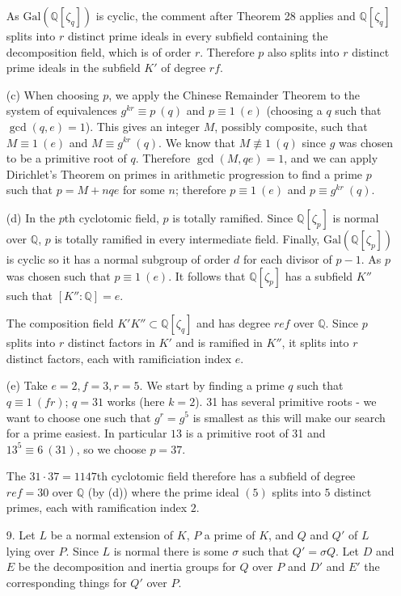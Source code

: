 \documentclass{article}
\newcommand{\Q}[0]{\mathbb{Q}}
\newcommand{\modequiv}[3]{#1 \equiv #2\ (#3)}
\newcommand{\modnotequiv}[3]{#1 \not\equiv #2\ (#3)}
\begin{document}
\begin{enumerate}
    As $\text{Gal}(\Q[\zeta_{q}])$ is cyclic, the comment after Theorem 28 applies and $\Q[\zeta_{q}]$ splits into $r$ distinct prime ideals in every subfield containing the decomposition field, which is of order $r$.  Therefore $p$ also splits into $r$ distinct prime ideals in the subfield $K'$ of degree $rf$.

    \item[(c)] When choosing $p$, we apply the Chinese Remainder Theorem to the system of equivalences $\modequiv{g^{kr}}{p}{q}$ and $\modequiv{p}{1}{e}$ (choosing a $q$ such that $\gcd(q, e) = 1$).  This gives an integer $M$, possibly composite, such that $\modequiv{M}{1}{e}$ and $\modequiv{M}{g^{kr}}{q}$.  We know that $\modnotequiv{M}{1}{q}$ since $g$ was chosen to be a primitive root of $q$.  Therefore $\gcd(M, qe) = 1$, and we can apply Dirichlet's Theorem on primes in arithmetic progression to find a prime $p$ such that $p = M + nqe$ for some $n$; therefore $\modequiv{p}{1}{e}$ and $\modequiv{p}{g^{kr}}{q}$.

    \item[(d)] In the $p$th cyclotomic field, $p$ is totally ramified.  Since $\Q[\zeta_p]$ is normal over $\Q$, $p$ is totally ramified in every intermediate field.  Finally, $\text{Gal}(\Q[\zeta_p])$ is cyclic so it has a normal subgroup of order $d$ for each divisor of $p - 1$.  As $p$ was chosen such that $\modequiv{p}{1}{e}$.  It follows that $\Q[\zeta_p]$ has a subfield $K''$ such that $[K'' : \Q] = e$.

    The composition field $K' K'' \subset \Q[\zeta_{q}]$ and has degree $ref$ over $\Q$.  Since $p$ splits into $r$ distinct factors in $K'$ and is ramified in $K''$, it splits into $r$ distinct factors, each with ramificiation index $e$.

    \item[(e)]  Take $e = 2, f = 3, r = 5$.  We start by finding a prime $q$ such that $\modequiv{q}{1}{fr}$; $q = 31$ works (here $k = 2$).  31 has several primitive roots - we want to choose one such that $g^{r} = g^{5}$ is smallest as this will make our search for a prime easiest.  In particular $13$ is a primitive root of 31 and $\modequiv{13^{5}}{6}{31}$, so we choose $p = 37$.

    The $31 \cdot 37 = 1147$th cyclotomic field therefore has a subfield of degree $ref = 30$ over $\Q$ (by (d)) where the prime ideal $(5)$ splits into $5$ distinct primes, each with ramification index $2$.

\item[9.] Let $L$ be a normal extension of $K$, $P$ a prime of $K$, and $Q$ and $Q'$ of $L$ lying over $P$.  Since $L$ is normal there is some $\sigma$ such that $Q' = \sigma Q$.  Let $D$ and $E$ be the decomposition and inertia groups for $Q$ over $P$ and $D'$ and $E'$ the corresponding things for $Q'$ over $P$.


\end{enumerate}
\end{document}
